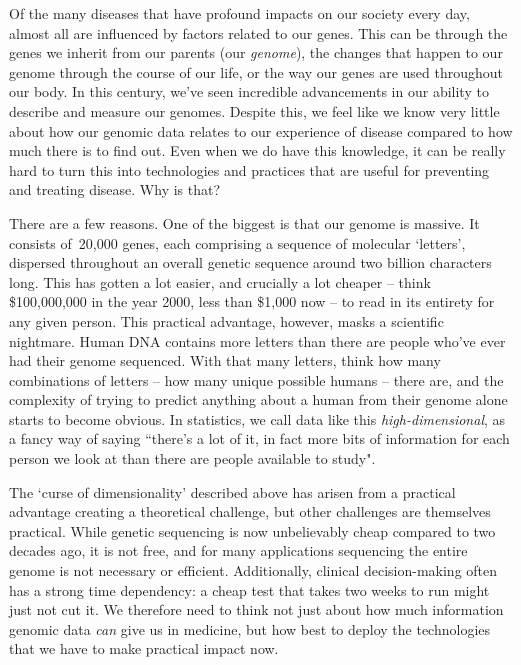 \documentclass[../thesis.tex]{subfiles}
\begin{document}
Of the many diseases that have profound impacts on our society every day, almost all are influenced by factors related to our genes. This can be through the genes we inherit from our parents (our \emph{genome}), the changes that happen to our genome through the course of our life, or the way our genes are used throughout our body. In this century, we've seen incredible advancements in our ability to describe and measure our genomes. Despite this, we feel like we know very little about how our genomic data relates to our experience of disease compared to how much there is to find out. Even when we do have this knowledge, it can be really hard to turn this into technologies and practices that are useful for preventing and treating disease. Why is that?

There are a few reasons. One of the biggest is that our genome is massive. It consists of~20,000 genes, each comprising a sequence of molecular `letters', dispersed throughout an overall genetic sequence around two billion characters long. This has gotten a lot easier, and crucially a lot cheaper -- think \$100,000,000 in the year 2000, less than \$1,000 now -- to read in its entirety for any given person. This practical advantage, however, masks a scientific nightmare. Human DNA contains more letters than there are people who've ever had their genome sequenced. With that many letters, think how many combinations of letters -- how many unique possible humans -- there are, and the complexity of trying to predict anything about a human from their genome alone starts to become obvious. In statistics, we call data like this \emph{high-dimensional}, as a fancy way of saying ``there's a lot of it, in fact more bits of information for each person we look at than there are people available to study". 

The `curse of dimensionality' described above has arisen from a practical advantage creating a theoretical challenge, but other challenges are themselves practical. While genetic sequencing is now unbelievably cheap compared to two decades ago, it is not free, and for many applications sequencing the entire genome is not necessary or efficient. Additionally, clinical decision-making often has a strong time dependency: a cheap test that takes two weeks to run might just not cut it. We therefore need to think not just about how much information genomic data \emph{can} give us in medicine, but how best to deploy the technologies that we have to make practical impact now.
\end{document}
